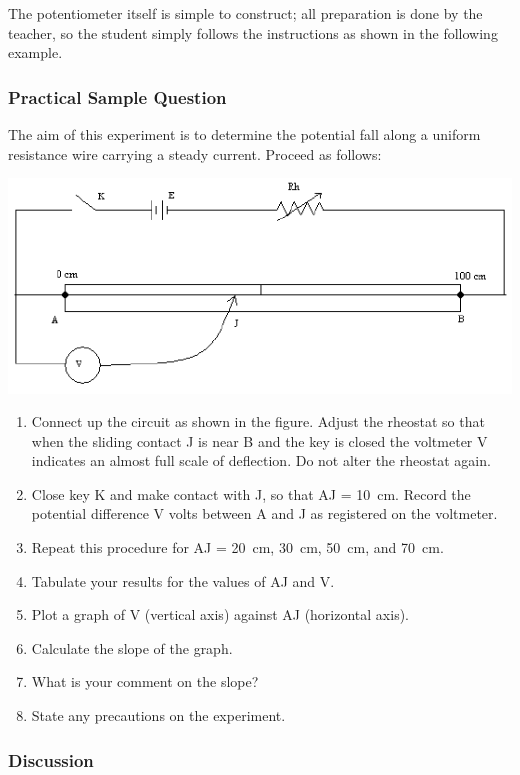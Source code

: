 The potentiometer itself is simple to construct; all preparation is done by the teacher, so
the student simply follows the instructions as shown in the following example.

\subsubsection{Practical Sample Question}

The aim of this experiment is to determine the potential fall along a uniform
resistance wire carrying a steady current. Proceed as follows:

\begin{center}
\includegraphics{./img/meter-bridge-1.png}
\end{center}

\begin{enumerate}
\item{Connect up the circuit as shown in the figure. Adjust the rheostat so that when the sliding
contact J is near B and the key is closed the voltmeter V indicates an almost full scale
of deflection. Do not alter the rheostat again.}
\item{Close key K and make contact with J, so that AJ = 10~cm. Record the potential
difference V volts between A and J as registered on the voltmeter.}
\item{Repeat this procedure for AJ = 20~cm, 30~cm, 50~cm, and 70~cm.}
\item{Tabulate your results for the values of AJ and V.}
\item{Plot a graph of V (vertical axis) against AJ (horizontal axis).}
\item{Calculate the slope of the graph.}
\item{What is your comment on the slope?}
\item{State any precautions on the experiment.}
\end{enumerate}

\subsubsection{Discussion}


